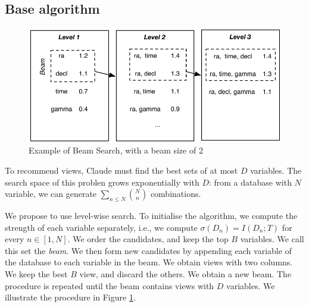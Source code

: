 \subsection{Base algorithm}
\begin{figure}[t!]
\centering
\includegraphics[width=0.8\columnwidth]{images/beam-search}
\caption{Example of Beam Search, with a beam size of 2}
\label{pic:beam-search}
\end{figure}

To recommend views, Claude must find the best sets of at most $D$ variables.
The search space of this problen grows exponentially with $D$: from a database
with $N$ variable, we can generate $\sum_{n \leq N} \binom{N}{n}$ combinations.

We propose to use level-wise search. To initialise the algorithm, we compute
the strength of each variable separately, i.e., we compute $\sigma(D_n) =
I(D_n; T)$ for every $n \in [1, N]$. We order the candidates, and keep the top
$B$ variables. We call this set the \emph{beam}. We then form new candidates by
appending each variable of the database to each variable in the beam. We obtain
views with two columns. We keep the best $B$ view, and discard the others. We
obtain a new beam.  The procedure is repeated until the beam contains views
with $D$ variables. We illustrate the procedure in Figure
\ref{pic:beam-search}.

